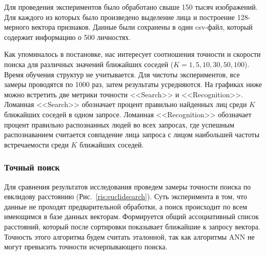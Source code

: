 Для проведения экспериментов было обработано свыше 150 тысяч изображений. Для каждого из которых было произведено выделение лица и построение 128-мерного вектора признаков. Данные были сохранены в один csv-файл, который содержит информацию о 500 личностях.

Как упоминалось в постановке, нас интересует соотношения точности и скорости поиска для различных значений ближайших соседей ($K = 1, 5, 10, 30, 50, 100$). Время обучения структур не учитывается. Для чистоты экспериментов, все замеры проводятся по 1000 раз, затем результаты усредняются. На графиках ниже можно встретить две метрики точности <<Search>> и <<Recognition>>. Ломанная <<Search>> обозначает процент правильно найденных лиц среди $K$ ближайших соседей в одном запросе. Ломанная <<Recognition>> обозначает процент правильно распознанных людей во всех запросах, где успешным распознаванием считается совпадение лица запроса с лицом наибольшей частоты встречаемости среди $K$ ближайших соседей.

\subsubsection{Точный поиск}

Для сравнения результатов исследования проведем замеры точности поиска по евклидову расстоянию (Рис.~\ref{ris:euclidsearch}). Суть эксперимента в том, что данные не проходят предварительной обработки, а поиск происходит по всем имеющимся в базе данных векторам. Формируется общий ассоциативный список расстояний, который после сортировки показывает ближайшие к запросу вектора. Точность этого алгоритма будем считать эталонной, так как алгоритмы ANN не могут превысить точности исчерпывающего поиска.

